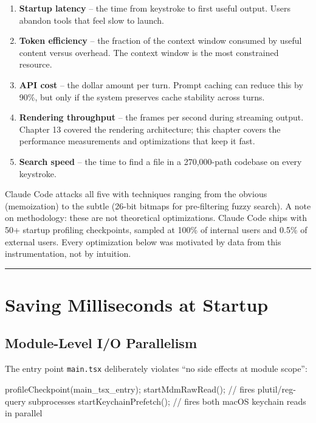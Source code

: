 \documentclass[
  english,
  11pt,
  letterpaper,
]{book}
\newenvironment{Shaded}{\begin{snugshade}}{\end{snugshade}}
\newcommand{\CommentTok}[1]{\textcolor[rgb]{0.37,0.37,0.37}{#1}}
\newcommand{\FunctionTok}[1]{\textcolor[rgb]{0.28,0.35,0.67}{#1}}
\newcommand{\NormalTok}[1]{\textcolor[rgb]{0.00,0.23,0.31}{#1}}
\newcommand{\OperatorTok}[1]{\textcolor[rgb]{0.37,0.37,0.37}{#1}}
\newcommand{\StringTok}[1]{\textcolor[rgb]{0.13,0.47,0.30}{#1}}
\providecommand{\tightlist}{%
  \setlength{\itemsep}{0pt}\setlength{\parskip}{0pt}}
\begin{document}
\begin{enumerate}
\def\labelenumi{\arabic{enumi}.}
\tightlist
\item
  \textbf{Startup latency} -- the time from keystroke to first useful
  output. Users abandon tools that feel slow to launch.
\item
  \textbf{Token efficiency} -- the fraction of the context window
  consumed by useful content versus overhead. The context window is the
  most constrained resource.
\item
  \textbf{API cost} -- the dollar amount per turn. Prompt caching can
  reduce this by 90\%, but only if the system preserves cache stability
  across turns.
\item
  \textbf{Rendering throughput} -- the frames per second during
  streaming output. Chapter 13 covered the rendering architecture; this
  chapter covers the performance measurements and optimizations that
  keep it fast.
\item
  \textbf{Search speed} -- the time to find a file in a 270,000-path
  codebase on every keystroke.
\end{enumerate}

Claude Code attacks all five with techniques ranging from the obvious
(memoization) to the subtle (26-bit bitmaps for pre-filtering fuzzy
search). A note on methodology: these are not theoretical optimizations.
Claude Code ships with 50+ startup profiling checkpoints, sampled at
100\% of internal users and 0.5\% of external users. Every optimization
below was motivated by data from this instrumentation, not by intuition.

\begin{center}\rule{0.5\linewidth}{0.5pt}\end{center}

\section{Saving Milliseconds at
Startup}\label{saving-milliseconds-at-startup}

\subsection{Module-Level I/O
Parallelism}\label{module-level-io-parallelism}

The entry point \texttt{main.tsx} deliberately violates ``no side
effects at module scope'':

\begin{Shaded}
\begin{Highlighting}[]
\FunctionTok{profileCheckpoint}\NormalTok{(}\StringTok{\textquotesingle{}main\_tsx\_entry\textquotesingle{}}\NormalTok{)}\OperatorTok{;}
\FunctionTok{startMdmRawRead}\NormalTok{()}\OperatorTok{;}       \CommentTok{// fires plutil/reg{-}query subprocesses}
\FunctionTok{startKeychainPrefetch}\NormalTok{()}\OperatorTok{;}  \CommentTok{// fires both macOS keychain reads in parallel}
\end{Highlighting}
\end{Shaded}
\end{document}
